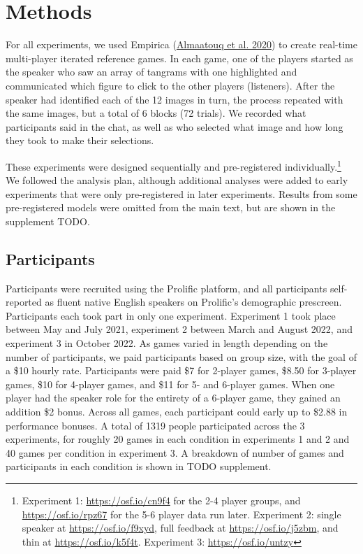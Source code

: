\documentclass[
  english,
  a4paper,
]{article}
\begin{document}
\hypertarget{methods}{%
\section{Methods}\label{methods}}

For all experiments, we used Empirica (\protect\hyperlink{ref-almaatouqEmpiricaVirtualLab2020}{Almaatouq et al. 2020}) to create real-time multi-player iterated reference games. In each game, one of the players started as the speaker who saw an array of tangrams with one highlighted and communicated which figure to click to the other players (listeners). After the speaker had identified each of the 12 images in turn, the process repeated with the same images, but a total of 6 blocks (72 trials). We recorded what participants said in the chat, as well as who selected what image and how long they took to make their selections.

These experiments were designed sequentially and pre-registered individually.\footnote{Experiment 1: \url{https://osf.io/cn9f4} for the 2-4 player groups, and \url{https://osf.io/rpz67} for the 5-6 player data run later. Experiment 2: single speaker at \url{https://osf.io/f9xyd}, full feedback at \url{https://osf.io/j5zbm}, and thin at \url{https://osf.io/k5f4t}. Experiment 3: \url{https://osf.io/untzy}} We followed the analysis plan, although additional analyses were added to early experiments that were only pre-registered in later experiments. Results from some pre-registered models were omitted from the main text, but are shown in the supplement TODO.

\hypertarget{participants}{%
\subsection{Participants}\label{participants}}

Participants were recruited using the Prolific platform, and all participants self-reported as fluent native English speakers on Prolific's demographic prescreen. Participants each took part in only one experiment. Experiment 1 took place between May and July 2021, experiment 2 between March and August 2022, and experiment 3 in October 2022. As games varied in length depending on the number of participants, we paid participants based on group size, with the goal of a \$10 hourly rate. Participants were paid \$7 for 2-player games, \$8.50 for 3-player games, \$10 for 4-player games, and \$11 for 5- and 6-player games. When one player had the speaker role for the entirety of a 6-player game, they gained an addition \$2 bonus. Across all games, each participant could early up to \$2.88 in performance bonuses. A total of 1319 people participated across the 3 experiments, for roughly 20 games in each condition in experiments 1 and 2 and 40 games per condition in experiment 3. A breakdown of number of games and participants in each condition is shown in TODO supplement.
\end{document}
